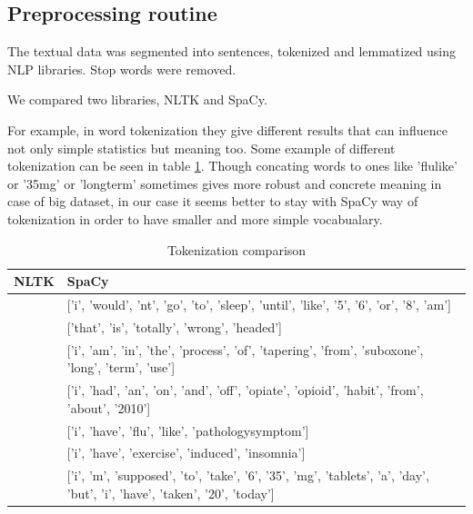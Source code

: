 \documentclass[11pt]{article}
\begin{document}
\subsection{Preprocessing routine}
\label{subsec:preprocessing}
The textual data was segmented into sentences, tokenized and lemmatized using NLP
libraries. Stop words were removed.

We compared two libraries, NLTK and SpaCy.

For example, in word tokenization they give different results that can influence not only simple statistics but meaning too. Some example of different tokenization can be seen in table \ref{token_dif}. Though concating words to ones like 'flulike' or '35mg' or 'longterm' sometimes gives more robust and concrete meaning in case of big dataset, in our case it seems better to stay with SpaCy way of tokenization in order to have smaller and more simple vocabualary.

\begin{center}
\begin{table}
\begin{tabular}{ |p{7cm}|p{7cm}| }
\hline
NLTK & SpaCy \\ \hline
['i', 'wouldnt', 'go', 'to', 'sleep', 'until', 'like', '5', '6', 'or', '8am'] & 
['i', 'would', 'nt', 'go', 'to', 'sleep', 'until', 'like', '5', '6', 'or', '8', 'am'] \\ \hline
['that', 'is', 'totally', 'wrongheaded'] & ['that', 'is', 'totally', 'wrong', 'headed'] \\ \hline
['i', 'am', 'in', 'the', 'process', 'of', 'tapering', 'from', 'suboxone', 'longterm', 'use'] & 
['i', 'am', 'in', 'the', 'process', 'of', 'tapering', 'from', 'suboxone', 'long', 'term', 'use'] \\ \hline
['i', 'had', 'an', 'onandoff', 'opiateopioid', 'habit', 'from', 'about', '2010'] & 
['i', 'had', 'an', 'on', 'and', 'off', 'opiate', 'opioid', 'habit', 'from', 'about', '2010'] \\ 
\hline
['i', 'have', 'flulike', 'pathologysymptom'] & ['i', 'have', 'flu', 'like', 'pathologysymptom'] \\ \hline
['i', 'have', 'exerciseinduced', 'insomnia'] & ['i', 'have', 'exercise', 'induced', 'insomnia'] \\ \hline
['i', 'm', 'supposed', 'to', 'take', '6', '35mg', 'tablets', 'a', 'day', 'but', 'i', 'have', 'taken', '20', 'today'] & 
['i', 'm', 'supposed', 'to', 'take', '6', '35', 'mg', 'tablets', 'a', 'day', 'but', 'i', 'have', 'taken', '20', 'today'] \\ 
\hline
\end{tabular}	
\caption{Tokenization comparison}\label{token_dif}
\end{table}
\end{center}
\FloatBarrier
\end{document}
